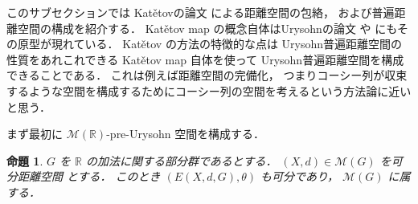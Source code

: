 \documentclass[leqno, 12pt]{jsarticle}
\newtheorem{prop}[thm]{命題}
\newcommand{\rr}{\mathbb{R}}
\newcommand{\Met}[1]{\mathscr{M}(#1)}
\newcommand{\Espace}[3]{E(#1,#2,#3)}
\newcommand{\KatDist}{\theta}
\begin{document}
このサブセクションでは
Kat\v{e}tovの論文
\cite{Ka}
による距離空間の包絡，
および普遍距離空間の構成を紹介する．
Kat\v{e}tov map
の概念自体はUrysohnの論文
 \cite{Ury1}
 や
  \cite{Ury2}
にもその原型が現れている．
Kat\v{e}tov
の方法の特徴的な点は
Urysohn普遍距離空間の性質をあれこれできる
Kat\v{e}tov map
自体を使って
Urysohn普遍距離空間を構成できることである．
これは例えば距離空間の完備化，
つまりコーシー列が収束するような空間を構成するためにコーシー列の空間を考えるという方法論に近いと思う．




まず最初に
$\Met{\rr}$-pre-Urysohn
空間を構成する．
\begin{prop}\label{prop:func:separable}
$G$
を
$\rr$
の加法に関する部分群であるとする．
$(X, d)\in \Met{G}$%
を可分距離空間
とする．
このとき
$(\Espace{X}{d}{G}, \KatDist)$
も可分であり，
$\Met{G}$
に属する．
\end{prop}
\end{document}
